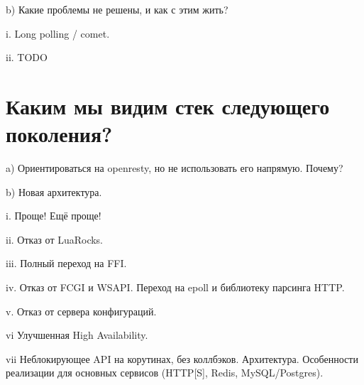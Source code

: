 \documentclass[aspectratio=169,handout,bigger]{beamer}
\begin{document}
\begin{frame}
b) Какие проблемы не решены, и как с этим жить?
\end{frame}

\begin{frame}
i. Long polling / comet.
\end{frame}

\begin{frame}
ii. TODO
\end{frame}


\section{Каким мы видим стек следующего поколения?}

\begin{frame}
a) Ориентироваться на openresty, но не использовать его напрямую. Почему?
\end{frame}

\begin{frame}
b) Новая архитектура.
\end{frame}

\begin{frame}
i. Проще! Ещё проще!
\end{frame}

\begin{frame}
ii. Отказ от LuaRocks.
\end{frame}

\begin{frame}
iii. Полный переход на FFI.
\end{frame}

\begin{frame}
iv. Отказ от FCGI и WSAPI. Переход на epoll и библиотеку парсинга HTTP.
\end{frame}

\begin{frame}
v. Отказ от сервера конфигураций.
\end{frame}

\begin{frame}
vi Улучшенная High Availability.
\end{frame}

\begin{frame}
vii Неблокирующее API на корутинах, без коллбэков. Архитектура. Особенности реализации для основных сервисов (HTTP[S], Redis, MySQL/Postgres).
\end{frame}
\end{document}
